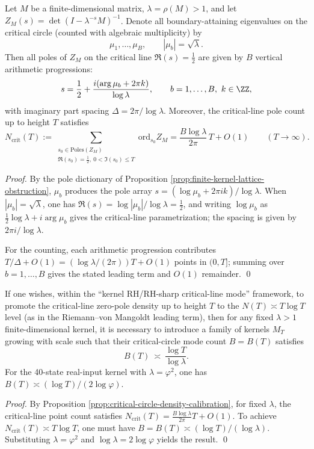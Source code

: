 \begin{proposition}\label{prop:critical-circle-density-calibration}
Let \(M\) be a finite-dimensional matrix, \(\lambda=\rho(M)>1\), and let
\(
Z_M(s)=\det(I-\lambda^{-s}M)^{-1}
\).
Denote all boundary-attaining eigenvalues on the critical circle (counted with algebraic multiplicity) by
\[
\mu_1,\dots,\mu_B,\qquad |\mu_b|=\sqrt{\lambda}.
\]
Then all poles of \(Z_M\) on the critical line \(\Re(s)=\tfrac12\) are given by \(B\) vertical arithmetic progressions:
\[
s=\frac12+\frac{i(\arg\mu_b+2\pi k)}{\log\lambda},\qquad b=1,\dots,B,\ k\in\ZZ,
\]
with imaginary part spacing \(\Delta=2\pi/\log\lambda\). Moreover, the critical-line pole count up to height \(T\) satisfies
\[
N_{\mathrm{crit}}(T)
:=\sum_{\substack{s_0\in\mathrm{Poles}(Z_M)\\ \Re(s_0)=\tfrac12,\ 0<\Im(s_0)\le T}}\mathrm{ord}_{s_0}Z_M
=\frac{B\log\lambda}{2\pi}\,T+O(1)\qquad(T\to\infty).
\]
\end{proposition}
\begin{proof}
By the pole dictionary of Proposition \ref{prop:finite-kernel-lattice-obstruction}, \(\mu_b\) produces the pole array
\(
s=(\log\mu_b+2\pi ik)/\log\lambda
\).
When \(|\mu_b|=\sqrt{\lambda}\), one has \(\Re(s)=\log|\mu_b|/\log\lambda=\tfrac12\), and writing \(\log\mu_b\) as \(\tfrac12\log\lambda+i\arg\mu_b\) gives the critical-line parametrization; the spacing is given by \(2\pi i/\log\lambda\).
\par
For the counting, each arithmetic progression contributes \(T/\Delta+O(1)=(\log\lambda/(2\pi))T+O(1)\) points in \((0,T]\); summing over \(b=1,\dots,B\) gives the stated leading term and \(O(1)\) remainder. \qed
\end{proof}

\begin{corollary}\label{cor:critical-circle-mode-growth}
If one wishes, within the ``kernel RH/RH-sharp critical-line mode'' framework, to promote the critical-line zero-pole density up to height \(T\) to the \(N(T)\asymp T\log T\) level (as in the Riemann--von Mangoldt leading term), then for any fixed \(\lambda>1\) finite-dimensional kernel, it is necessary to introduce a family of kernels \(M_T\) growing with scale such that their critical-circle mode count \(B=B(T)\) satisfies
\[
B(T)\ \asymp\ \frac{\log T}{\log\lambda}.
\]
For the 40-state real-input kernel with \(\lambda=\varphi^2\), one has \(B(T)\asymp (\log T)/(2\log\varphi)\).
\end{corollary}
\begin{proof}
By Proposition \ref{prop:critical-circle-density-calibration}, for fixed \(\lambda\), the critical-line point count satisfies \(N_{\mathrm{crit}}(T)=\frac{B\log\lambda}{2\pi}T+O(1)\).
To achieve \(N_{\mathrm{crit}}(T)\asymp T\log T\), one must have \(B=B(T)\asymp (\log T)/(\log\lambda)\).
Substituting \(\lambda=\varphi^2\) and \(\log\lambda=2\log\varphi\) yields the result. \qed
\end{proof}

